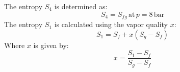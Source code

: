 The entropy \( S_4 \) is determined as:  
\[
S_4 = S_{fg} \, \text{at} \, p = 8 \, \text{bar}
\]  
The entropy \( S_1 \) is calculated using the vapor quality \( x \):  
\[
S_1 = S_f + x (S_g - S_f)
\]  
Where \( x \) is given by:  
\[
x = \frac{S_1 - S_f}{S_g - S_f}
\]